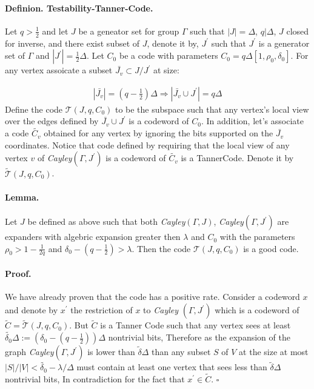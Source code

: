 \documentclass{article}
\newcommand{\Jvv}{ \bar{J_{v}} }
\newcommand{\Cvv}{ \tilde{C_{v}} }
\begin{document}
\begin{multicols*}{2}
  \paragraph{Definion. Testability-Tanner-Code.} Let $q > \frac{1}{2}$ and let $J$ be a geneator set for group $\Gamma$ such that $|J| = \Delta$, $q | \Delta $, $J$ closed for inverse, and there exist subset of $J$, denote it by, $J^{\prime}$ such that $J^{\prime}$ is a generator set of $\Gamma$ and $|J^{\prime}| = \frac{1}{2}\Delta$. Let $C_{0}$ be a code with parameters $C_{0} = q\Delta \left[1, \rho_{0}, \delta_{0}\right]$. For any vertex assoicate a subset $\Jvv \subset J/J^{\prime}$ at size: 

  \begin{equation*}
    \begin{split}
      |\Jvv| = \left( q - \frac{1}{2} \right)\Delta \Rightarrow |\Jvv \cup J^{\prime}| = q\Delta
    \end{split}
  \end{equation*}
  Define the code $\mathcal{T}\left(J, q , C_{0}\right)$ to be the subspace such that any vertex's local view over the edges defined by $\Jvv \cup J^{\prime}$ is a codeword of $C_{0}$. In addition, let's associate a code $\Cvv$ obtained for any vertex by ignoring the bits supported on the $\Jvv$ coordinates. Notice that code defined by requiring that the local view of any vertex $v$ of \emph{Cayley}$\left(\Gamma, J^{\prime} \right)$ is a codeword of $\Cvv$ is a TannerCode. Denote it by $ \tilde{\mathcal{T}}\left(J, q ,C_{0}\right)$.   

  \paragraph{Lemma.} Let $J$ be defined as above such that both \emph{Cayley}$\left( \Gamma, J \right)$, \emph{Cayley}$\left( \Gamma, J^{\prime} \right)$ are expanders with algebric expansion greater then $\lambda$ and $C_0$ with the parameters $\rho_{0} > 1 - \frac{1}{2q}$ and $ \delta_{0} - \left( q - \frac{1}{2} \right) > \lambda$. Then the code $\mathcal{T}\left(J, q ,C_{0}\right)$ is a good code. 
  \paragraph{Proof.} We have already proven that the code has a positive rate. Consider a codeword $x$ and denote by $x^{\prime}$ the restriction of $x$ to \emph{Cayley }$\left( \Gamma, J^{\prime}  \right)$ which is a codeword of $\tilde{C} = \tilde{\mathcal{T}}\left(J, q ,C_{0}\right)$. But $\tilde{C}$ is a Tanner Code such that any vertex sees at least $ \tilde{\delta_{0}} \Delta := \left(\delta_{0} - \left( q - \frac{1}{2}   \right) \right)\Delta $ nontrivial bits, Therefore as the expansion of the graph \emph{Cayley}$\left( \Gamma, J^{\prime} \right)$ is lower than $\tilde{\delta}\Delta$ than any subset $S$ of $V$ at the size at most $|S|/|V| < \tilde{\delta_{0}} - \lambda / \Delta $  must contain at least one vertex that sees less than  $\tilde{\delta}\Delta$ nontrivial bits, In contradiction for the fact that $x^{\prime} \in \tilde{C}$. $\square$ 


\end{multicols*}
\end{document}
